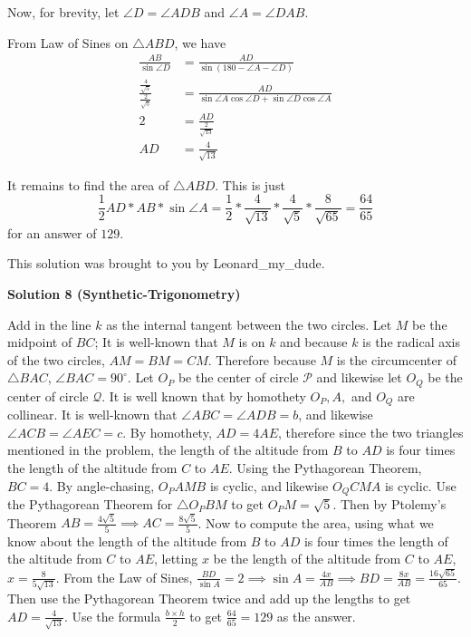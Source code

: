 \begin{enumerate}
 Now, for brevity, let $\angle D = \angle ADB$ and $\angle A = \angle DAB$.

 From Law of Sines on $\triangle ABD$, we have
 \begin{align*} \frac{AB}{\sin \angle D} &= \frac{AD}{\sin (180-\angle A - \angle D)} \\ \frac{\frac{4}{\sqrt5}}{\frac{2}{\sqrt5}} &= \frac{AD}{\sin \angle A \cos\angle D + \sin \angle D\cos\angle A} \\ 2 &= \frac{AD}{\frac{2}{\sqrt{13}}} \\ AD &= \frac{4}{\sqrt{13}} \end{align*}


 It remains to find the area of $\triangle ABD$. This is just 
 \[\frac12 AD*AB*\sin \angle A = \frac12 * \frac{4}{\sqrt{13}}*\frac{4}{\sqrt5}*\frac{8}{\sqrt{65}} = \frac{64}{65}\] for an answer of $\boxed{129}.$

 This solution was brought to you by Leonard\_my\_dude.

 



\textbf{Solution 8 (Synthetic-Trigonometry)}

Add in the line $k$ as the internal tangent between the two circles. Let $M$ be the midpoint of $BC$; It is well-known that $M$ is on $k$ and because $k$ is the radical axis of the two circles, $AM=BM=CM$. Therefore because $M$ is the circumcenter of $\triangle{BAC}$, $\angle{BAC}=90^{\circ}$. Let $O_P$ be the center of circle $\mathcal{P}$ and likewise let $O_Q$ be the center of circle $\mathcal{Q}$. It is well known that by homothety $O_P, A,$ and $O_Q$ are collinear. It is well-known that $\angle{ABC}=\angle{ADB}=b$, and likewise $\angle{ACB}=\angle{AEC}=c$. By homothety, $AD=4AE$, therefore since the two triangles mentioned in the problem, the length of the altitude from $B$ to $AD$ is four times the length of the altitude from $C$ to $AE$. Using the Pythagorean Theorem, $BC = 4$. By angle-chasing, $O_{P}AMB$ is cyclic, and likewise $O_{Q}CMA$ is cyclic. Use the Pythagorean Theorem for $\triangle{O_{P}BM}$ to get $O_{P}M=\sqrt{5}$. Then by Ptolemy's Theorem $AB=\frac{4\sqrt{5}}{5} \implies AC=\frac{8\sqrt{5}}{5}$. Now to compute the area, using what we know about the length of the altitude from $B$ to $AD$ is four times the length of the altitude from $C$ to $AE$, letting $x$ be the length of the altitude from $C$ to $AE$, $x=\frac{8}{5\sqrt{13}}$. From the Law of Sines, $\frac{BD}{\sin{A}}=2 \implies \sin{A}=\frac{4x}{AB} \implies BD=\frac{8x}{AB}=\frac{16\sqrt{65}}{65}$. Then use the Pythagorean Theorem twice and add up the lengths to get $AD=\frac{4}{\sqrt{13}}$. Use the formula $\frac{b \times h}{2}$ to get $\frac{64}{65} = \boxed{129}$ as the answer.


\end{enumerate}
